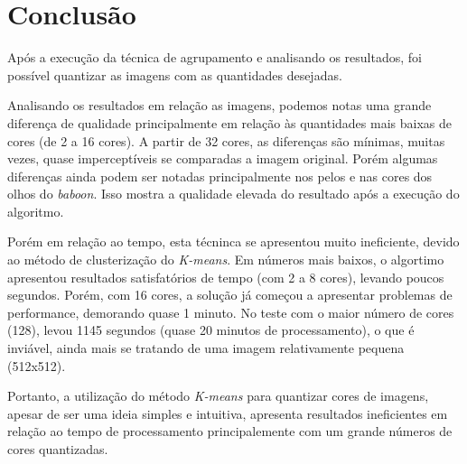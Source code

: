 \documentclass{article}
\begin{document}
\section{Conclusão}

Após a execução da técnica de agrupamento e analisando os resultados, foi possível quantizar as imagens com as quantidades desejadas.

Analisando os resultados em relação as imagens, podemos notas uma grande diferença de qualidade principalmente em relação às quantidades mais baixas de cores (de 2 a 16 cores). A partir de 32 cores, as diferenças são mínimas, muitas vezes, quase imperceptíveis se comparadas a imagem original. Porém algumas diferenças ainda podem ser notadas principalmente nos pelos e nas cores dos olhos do \textit{baboon}. Isso mostra a qualidade elevada do resultado após a execução do algoritmo.

Porém em relação ao tempo, esta técninca se apresentou muito ineficiente, devido ao método de clusterização do \textit{K-means}. Em números mais baixos, o algortimo apresentou resultados satisfatórios de tempo (com 2 a 8 cores), levando poucos segundos. Porém, com 16 cores, a solução já começou a apresentar problemas de performance, demorando quase 1 minuto. No teste com o maior número de cores (128), levou 1145 segundos (quase 20 minutos de processamento), o que é inviável, ainda mais se tratando de uma imagem relativamente pequena (512x512).

Portanto, a utilização do método \textit{K-means} para quantizar cores de imagens, apesar de ser uma ideia simples e intuitiva, apresenta resultados ineficientes em relação ao tempo de processamento principalemente com um grande números de cores quantizadas. 



\end{document}
